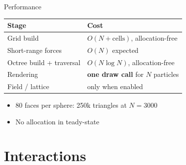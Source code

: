 \documentclass[10pt]{beamer}
\begin{document}
\begin{frame}{Performance}
	\centering
	\begin{tabular}{@{}ll@{}}
		\toprule
		\textbf{Stage}           & \textbf{Cost}                            \\
		\midrule
		Grid build               & $O(N + \text{cells})$, allocation-free   \\
		Short-range forces       & $O(N)$ expected                          \\
		Octree build + traversal & $O(N \log N)$, allocation-free           \\
		Rendering                & \textbf{one draw call} for $N$ particles \\
		Field / lattice          & only when enabled                        \\
		\bottomrule
	\end{tabular}
	\vspace{2ex}
	\begin{flushleft}
		\begin{itemize}\small
			\item 80 faces per sphere: 250k triangles at $N=3000$
			\item No allocation in teady-state
		\end{itemize}
	\end{flushleft}
\end{frame}

\section{Interactions}

\end{document}
